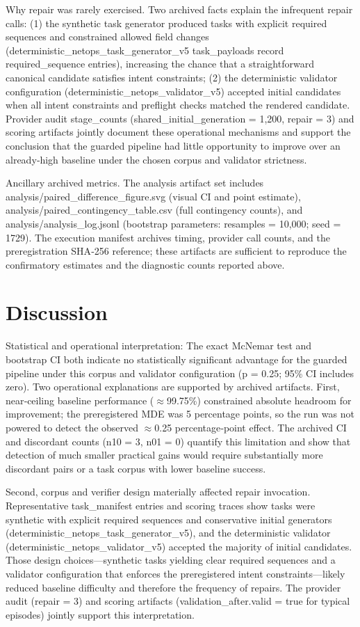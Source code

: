 \documentclass[conference]{IEEEtran}
\begin{document}
Why repair was rarely exercised. Two archived facts explain the infrequent repair calls: (1) the synthetic task generator produced tasks with explicit required sequences and constrained allowed field changes (deterministic\_netops\_task\_generator\_v5 task\_payloads record required\_sequence entries), increasing the chance that a straightforward canonical candidate satisfies intent constraints; (2) the deterministic validator configuration (deterministic\_netops\_validator\_v5) accepted initial candidates when all intent constraints and preflight checks matched the rendered candidate. Provider audit stage\_counts (shared\_initial\_generation = 1,200, repair = 3) and scoring artifacts jointly document these operational mechanisms and support the conclusion that the guarded pipeline had little opportunity to improve over an already‑high baseline under the chosen corpus and validator strictness.

Ancillary archived metrics. The analysis artifact set includes analysis/paired\_difference\_figure.svg (visual CI and point estimate), analysis/paired\_contingency\_table.csv (full contingency counts), and analysis/analysis\_log.jsonl (bootstrap parameters: resamples = 10,000; seed = 1729). The execution manifest archives timing, provider call counts, and the preregistration SHA‑256 reference; these artifacts are sufficient to reproduce the confirmatory estimates and the diagnostic counts reported above.

\section{Discussion}
Statistical and operational interpretation: The exact McNemar test and bootstrap CI both indicate no statistically significant advantage for the guarded pipeline under this corpus and validator configuration (p = 0.25; 95\% CI includes zero). Two operational explanations are supported by archived artifacts. First, near‑ceiling baseline performance (\ensuremath{\approx}99.75\%) constrained absolute headroom for improvement; the preregistered MDE was 5 percentage points, so the run was not powered to detect the observed \ensuremath{\approx}0.25 percentage‑point effect. The archived CI and discordant counts (n10 = 3, n01 = 0) quantify this limitation and show that detection of much smaller practical gains would require substantially more discordant pairs or a task corpus with lower baseline success.

Second, corpus and verifier design materially affected repair invocation. Representative task\_manifest entries and scoring traces show tasks were synthetic with explicit required sequences and conservative initial generators (deterministic\_netops\_task\_generator\_v5), and the deterministic validator (deterministic\_netops\_validator\_v5) accepted the majority of initial candidates. Those design choices---synthetic tasks yielding clear required sequences and a validator configuration that enforces the preregistered intent constraints---likely reduced baseline difficulty and therefore the frequency of repairs. The provider audit (repair = 3) and scoring artifacts (validation\_after.valid = true for typical episodes) jointly support this interpretation.
\end{document}
